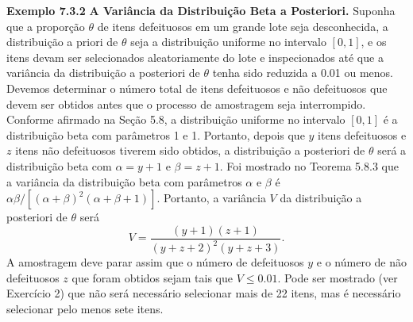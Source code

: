 \vspace{1cm}
\noindent\textbf{Exemplo 7.3.2} \quad \textbf{A Variância da Distribuição Beta a Posteriori.} Suponha que a proporção $\theta$ de itens defeituosos em um grande lote seja desconhecida, a distribuição a priori de $\theta$ seja a distribuição uniforme no intervalo $[0, 1]$, e os itens devam ser selecionados aleatoriamente do lote e inspecionados até que a variância da distribuição a posteriori de $\theta$ tenha sido reduzida a 0.01 ou menos. Devemos determinar o número total de itens defeituosos e não defeituosos que devem ser obtidos antes que o processo de amostragem seja interrompido.
Conforme afirmado na Seção 5.8, a distribuição uniforme no intervalo $[0, 1]$ é a distribuição beta com parâmetros 1 e 1. Portanto, depois que $y$ itens defeituosos e $z$ itens não defeituosos tiverem sido obtidos, a distribuição a posteriori de $\theta$ será a distribuição beta com $\alpha=y+1$ e $\beta=z+1$. Foi mostrado no Teorema 5.8.3 que a variância da distribuição beta com parâmetros $\alpha$ e $\beta$ é $\alpha\beta/ [(\alpha+\beta)^2(\alpha+\beta+1)]$. Portanto, a variância $V$ da distribuição a posteriori de $\theta$ será
$$ V = \frac{(y+1)(z+1)}{(y+z+2)^2(y+z+3)}. $$
A amostragem deve parar assim que o número de defeituosos $y$ e o número de não defeituosos $z$ que foram obtidos sejam tais que $V \le 0.01$. Pode ser mostrado (ver Exercício 2) que não será necessário selecionar mais de 22 itens, mas é necessário selecionar pelo menos sete itens.

